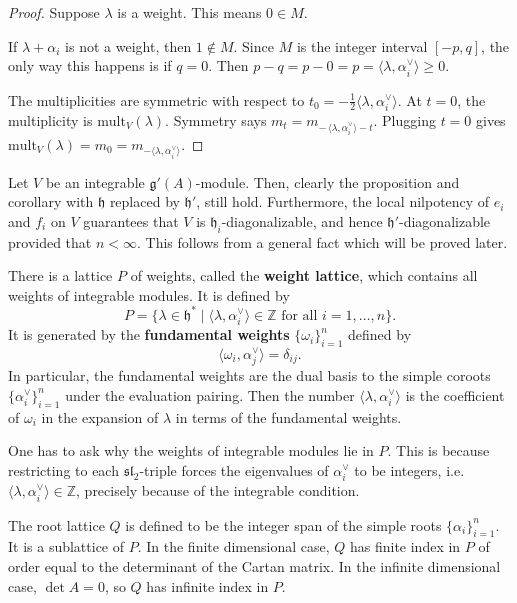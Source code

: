 \documentclass[12pt]{article}
\begin{document}
\begin{proof}

    Suppose $\lambda$ is a weight. This means $0\in M$.

    If $\lambda+\alpha_i$ is not a weight, then $1\notin M$. Since $M$ is the integer interval $[-p,q]$, the only way this happens is if $q=0$. Then
    $p - q = p - 0 = p = \langle \lambda,\alpha_i^\vee\rangle \ge 0$.

    The multiplicities are symmetric with respect to $t_0 = -\tfrac{1}{2}\langle \lambda,\alpha_i^\vee\rangle$. At $t=0$, the multiplicity is $\mathrm{mult}_V(\lambda)$. Symmetry says $m_t = m_{-\,\langle \lambda,\alpha_i^\vee\rangle - t}$. Plugging $t=0$ gives $\mathrm{mult}_V(\lambda) = m_0 = m_{-\langle \lambda,\alpha_i^\vee\rangle}$.
\end{proof}

\begin{remark}
    Let $V$ be an integrable $\mathfrak{g}'(A)$-module. Then, clearly the proposition and corollary with $\mathfrak{h}$ replaced by $\mathfrak{h}'$, still hold. Furthermore, the local nilpotency of $e_i$ and $f_i$ on $V$
    guarantees that $V$ is $\mathfrak{h}_i$-diagonalizable, and hence $\mathfrak{h}'$-diagonalizable provided that $n<\infty$.
    This follows from a general fact which will be proved later.
\end{remark}


\begin{remark}

    There is a lattice $P$ of weights, called the \textbf{weight lattice}, which contains all weights of integrable modules. It is defined by
    \[    P = \{\lambda \in \mathfrak{h}^* \mid \langle \lambda, \alpha_i^\vee \rangle \in \mathbb{Z} \text{ for all } i=1,\dots,n\}.
    \]
    It is generated by the \textbf{fundamental weights} $\{\omega_i\}_{i=1}^n$ defined by
    \[    \langle \omega_i, \alpha_j^\vee \rangle = \delta_{ij}.
    \] In particular, the fundamental weights are the dual basis to the simple coroots $\{\alpha_i^\vee\}_{i=1}^n$ under the evaluation pairing. Then the number $\langle \lambda, \alpha_i^\vee \rangle$ is the coefficient of $\omega_i$ in the expansion of $\lambda$ in terms of the fundamental weights.

    One has to ask why the weights of integrable modules lie in $P$. This is because restricting to each $\mathfrak{sl}_2$-triple forces the eigenvalues of $\alpha_i^\vee$ to be integers, i.e. $\langle \lambda,\alpha_i^\vee\rangle \in \mathbb{Z}$, precisely because of the integrable condition.

    The root lattice $Q$ is defined to be the integer span of the simple roots $\{\alpha_i\}_{i=1}^n$. It is a sublattice of $P$. In the finite dimensional case, $Q$ has finite index in $P$ of order equal to the determinant of the Cartan matrix. In the infinite dimensional case, $\det A = 0$, so $Q$ has infinite index in $P$.
\end{remark}
\end{document}
